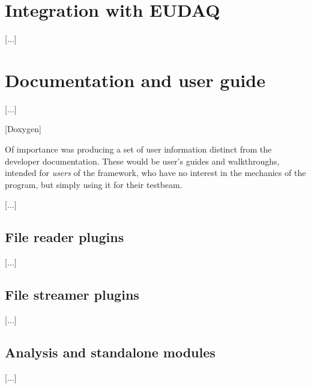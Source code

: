 
\section{Integration with EUDAQ}
[...]

\section{Documentation and user guide}
[...]

[Doxygen]

Of importance was producing a set of user information distinct from the developer documentation. These would be user's guides and walkthroughs, intended for \emph{users} of the framework, who have no interest in the mechanics of the program, but simply using it for their testbeam.

[...]

\subsection{File reader plugins}
[...]

\subsection{File streamer plugins}
[...]

\subsection{Analysis and standalone modules}
[...]
